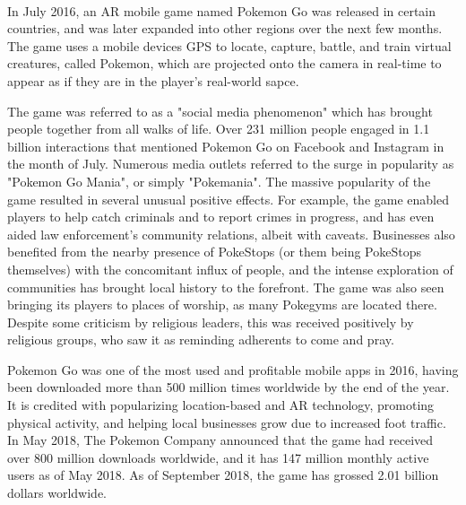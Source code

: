 \paragraph{}
In July 2016, an AR mobile game named Pokemon Go was released in certain countries, and was later expanded into other regions over the next few months. The game uses a mobile devices GPS to locate, capture, battle, and train virtual creatures, called Pokemon, which are projected onto the camera in real-time to appear as if they are in the player's real-world sapce. 
\par
The game was referred to as a "social media phenomenon" which has brought people together from all walks of life.\cite{duffy_2016} \cite{kain_2016} Over 231 million people engaged in 1.1 billion interactions that mentioned Pokemon Go on Facebook and Instagram in the month of July.\cite{laurenjohnson_2016} Numerous media outlets referred to the surge in popularity as "Pokemon Go Mania", or simply "Pokemania".\cite{isaac_2016} \cite{steinmetz_2016} The massive popularity of the game resulted in several unusual positive effects. For example, the game enabled players to help catch criminals and to report crimes in progress,\cite{daye_2016} \cite{reports_2016} \cite{staff} and has even aided law enforcement's community relations,\cite{cherelus_2016} albeit with caveats.\cite{rocha_2016} Businesses also benefited from the nearby presence of PokeStops (or them being PokeStops themselves) with the concomitant influx of people,\cite{shields_perlberg_2016}\cite{sydneyShaw_2016} and the intense exploration of communities has brought local history to the forefront.\cite{butcher_2016} The game was also seen bringing its players to places of worship, as many Pokegyms are located there.\cite{ahmed_2016} Despite some criticism by religious leaders, this was received positively by religious groups, who saw it as reminding adherents to come and pray.\cite{r_2016}
\par
Pokemon Go was one of the most used and profitable mobile apps in 2016, having been downloaded more than 500 million times worldwide by the end of the year. It is credited with popularizing location-based and AR technology, promoting physical activity, and helping local businesses grow due to increased foot traffic. In May 2018, The Pokemon Company announced that the game had received over 800 million downloads worldwide, and it has 147 million monthly active users as of May 2018. As of September 2018, the game has grossed 2.01 billion dollars worldwide.


